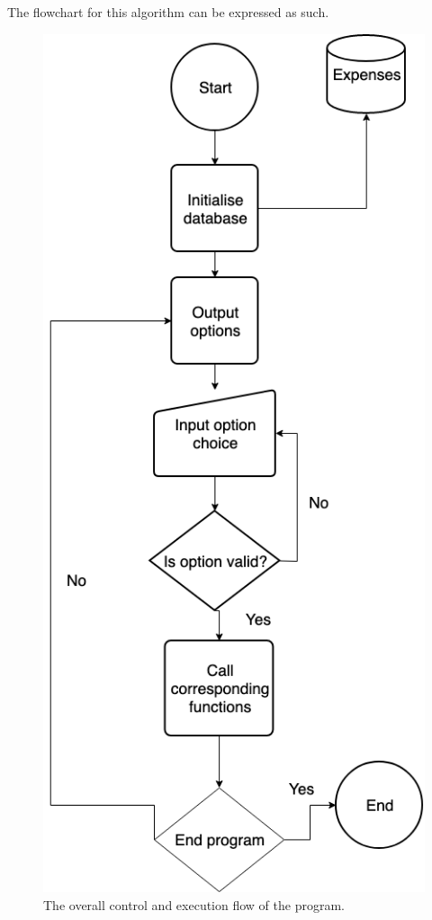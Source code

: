 \documentclass[12pt]{article}
\begin{document}
  The flowchart for this algorithm can be expressed as such.
    \begin{figure}[H]
      \centering
      \includegraphics[scale=0.4]{overall_program_flow.png}
      \caption{The overall control and execution flow of the program.}
    \end{figure}
\end{document}

